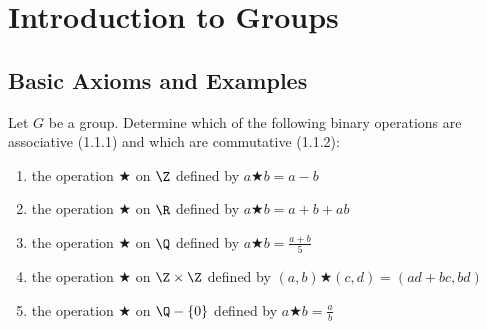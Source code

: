 \chapter{Introduction to Groups}

\section{Basic Axioms and Examples}

\begin{problem}
  Let $G$ be a group.
  Determine which of the following binary operations are associative (1.1.1) and which are commutative (1.1.2):
  \begin{enumerate}[label=(\alph*)]
    \item the operation $\bigstar$ on $\Z$ defined by $a \bigstar b = a - b$
    \item the operation $\bigstar$ on $\R$ defined by $a \bigstar b = a + b + ab$
    \item the operation $\bigstar$ on $\Q$ defined by $a \bigstar b = \frac{a + b}{5}$
    \item the operation $\bigstar$ on $\Z \times \Z$ defined by $(a, b) \bigstar (c, d) = (ad + bc, bd)$
    \item the operation $\bigstar$ on $\Q - \{0\}$ defined by $a \bigstar b = \frac{a}{b}$
  \end{enumerate}
\end{problem}

